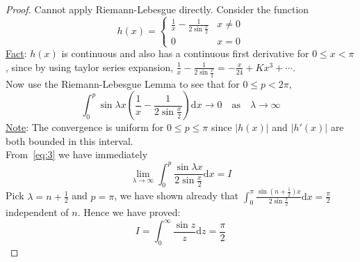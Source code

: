 \documentclass[12pt]{report}
\theoremstyle{definition}
\begin{document}
\begin{proof}
    Cannot apply Riemann-Lebesgue directly. Consider the function \[
        h(x) =
        \begin{cases}
            \frac{1}{x} - \frac{1}{2\sin{\frac{x}{2}}} & x \neq 0 \\
            0 & x=0
        \end{cases}
    \]
    \underline{Fact}: $h(x)$ is continuous and also has a continuous first derivative for $0 \le x < \pi$,
    since by using taylor series expansion, 
    $\frac{1}{x} - \frac{1}{2\sin{\frac{x}{2}}} = -\frac{x}{24} + Kx^{3} + \cdots$.
    \smallskip
    \\Now use the Riemann-Lebesgue Lemma to see that for $0 \le p < 2\pi$,\[
        \int_{0}^{p} \sin{\lambda x} \left(\frac{1}{x} - \frac{1}{2\sin{\frac{x}{2}}}\right) \mathrm{d}x \rightarrow 0
        \quad \text{as} \quad \lambda \rightarrow \infty
    \]
    \underline{Note}: The convergence is uniform for $0 \le p \le \pi$ since $|h(x)|$ and $|h'(x)|$ 
    are both bounded in this interval.
    \smallskip
    \\From~\eqref{eq:3} we have immediately \[
        \lim_{\lambda \rightarrow \infty}\int_{0}^{p} \frac{\sin{\lambda x}}{2\sin{\frac{x}{2}}} \mathrm{d}x = I
    \]
    Pick $\lambda = n + \frac{1}{2}$ and $p = \pi$, we have shown already that 
    $\int_{0}^{\pi} \frac{\sin{(n+\frac{1}{2})x}}{2\sin{\frac{x}{2}}} \mathrm{d}x = \frac{\pi}{2}$
    independent of $n$.
    Hence we have proved:\[
        I = \int_{0}^{\infty} \frac{\sin{z}}{z}\mathrm{d}z = \frac{\pi}{2}
    \]
\end{proof}
\end{document}

